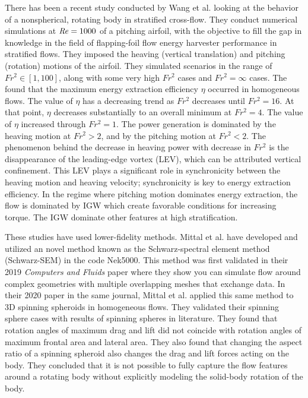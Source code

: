 There has been a recent study conducted by Wang et al. \cite{wang_numerical_2023} looking at the behavior of a nonspherical, rotating body in stratified cross-flow. They conduct numerical simulations at $\mathit{Re} = 1000$ of a pitching airfoil, with the objective to fill the gap in knowledge in the field of flapping-foil flow energy harvester performance in stratified flows. They imposed the heaving (vertical translation) and pitching (rotation) motions of the airfoil. They simulated scenarios in the range of $Fr^2 \in [1, 100]$, along with some very high $Fr^2$ cases and $Fr^2 = \infty$ cases. The found that the maximum energy extraction efficiency $\eta$ occurred in homogeneous flows. The value of $\eta$ has a decreasing trend as $Fr^2$ decreases until $Fr^2 = 16$. At that point, $\eta$ decreases substantially to an overall minimum at $Fr^2 = 4$. The value of $\eta$ increased through $Fr^2 = 1$. The power generation is dominated by the heaving motion at $Fr^2 > 2$, and by the pitching motion at $Fr^2 < 2$. The phenomenon behind the decrease in heaving power with decrease in $Fr^2$ is the disappearance of the leading-edge vortex (LEV), which can be attributed vertical confinement. This LEV plays a significant role in synchronicity between the heaving motion and heaving velocity; synchronicity is key to energy extraction efficiency. In the regime where pitching motion dominates energy extraction, the flow is dominated by IGW which create favorable conditions for increasing torque. The IGW dominate other features at high stratification. 

These studies have used lower-fidelity methods. Mittal et al. have developed and utilized an novel method known as the Schwarz-spectral element method (Schwarz-SEM) in the code Nek5000. This method was first validated in their 2019 \textit{Computers and Fluids} paper \cite{mittal_nonconforming_2019} where they show you can simulate flow around complex geometries with multiple overlapping meshes that exchange data. In their 2020 paper in the same journal, Mittal et al. applied this same method to 3D spinning spheroids in homogeneous flows. They validated their spinning sphere cases with results of spinning spheres in literature. They found that rotation angles of maximum drag and lift did not coincide with rotation angles of maximum frontal area and lateral area. They also found that changing the aspect ratio of a spinning spheroid also changes the drag and lift forces acting on the body. They concluded that it is not possible to fully capture the flow features around a rotating body without explicitly modeling the solid-body rotation of the body.  

